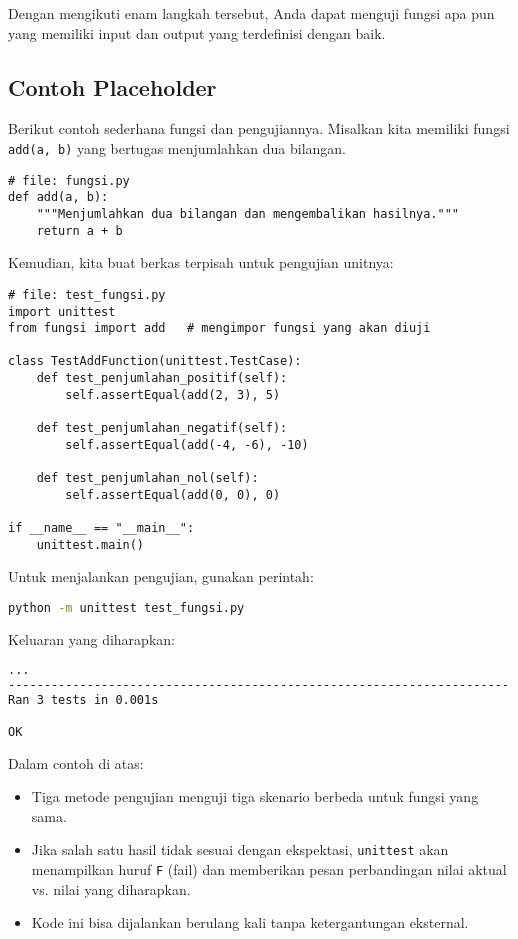 Dengan mengikuti enam langkah tersebut, Anda dapat menguji fungsi apa pun yang memiliki input dan output yang terdefinisi dengan baik.

\subsection{Contoh Placeholder}

Berikut contoh sederhana fungsi dan pengujiannya.  
Misalkan kita memiliki fungsi \texttt{add(a, b)} yang bertugas menjumlahkan dua bilangan.

\begin{lstlisting}[style=PythonStyle, caption={Fungsi yang akan diuji}, label={lst:fungsi-add}]
# file: fungsi.py
def add(a, b):
    """Menjumlahkan dua bilangan dan mengembalikan hasilnya."""
    return a + b
\end{lstlisting}

Kemudian, kita buat berkas terpisah untuk pengujian unitnya:

\begin{lstlisting}[style=PythonStyle, caption={Contoh pengujian fungsi sederhana}, label={lst:test-fungsi}]
# file: test_fungsi.py
import unittest
from fungsi import add   # mengimpor fungsi yang akan diuji

class TestAddFunction(unittest.TestCase):
    def test_penjumlahan_positif(self):
        self.assertEqual(add(2, 3), 5)

    def test_penjumlahan_negatif(self):
        self.assertEqual(add(-4, -6), -10)

    def test_penjumlahan_nol(self):
        self.assertEqual(add(0, 0), 0)

if __name__ == "__main__":
    unittest.main()
\end{lstlisting}

Untuk menjalankan pengujian, gunakan perintah:

\begin{lstlisting}[language=bash]
python -m unittest test_fungsi.py
\end{lstlisting}

Keluaran yang diharapkan:

\begin{lstlisting}[language=bash]
...
----------------------------------------------------------------------
Ran 3 tests in 0.001s

OK
\end{lstlisting}

Dalam contoh di atas:
\begin{itemize}
    \item Tiga metode pengujian menguji tiga skenario berbeda untuk fungsi yang sama.
    \item Jika salah satu hasil tidak sesuai dengan ekspektasi, \texttt{unittest} akan menampilkan huruf \texttt{F} (fail) dan memberikan pesan perbandingan nilai aktual vs. nilai yang diharapkan.
    \item Kode ini bisa dijalankan berulang kali tanpa ketergantungan eksternal.
\end{itemize}

